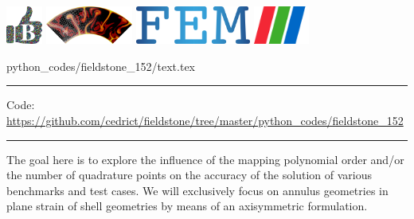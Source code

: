 \noindent
\includegraphics[height=1.25cm]{images/pictograms/benchmark}
\includegraphics[height=1.25cm]{images/pictograms/aspect_logo}
\includegraphics[height=1.25cm]{images/pictograms/FEM}
\includegraphics[height=1.25cm]{images/pictograms/paraview}



\begin{flushright} {\tiny {\color{gray} python\_codes/fieldstone\_152/text.tex}} \end{flushright}



\par\noindent\rule{\textwidth}{0.4pt}

\begin{center}
\inpython
{\small Code: \url{https://github.com/cedrict/fieldstone/tree/master/python_codes/fieldstone_152}}
\end{center}

\par\noindent\rule{\textwidth}{0.4pt}




The goal here is to explore the influence of the mapping polynomial order and/or
the number of quadrature points on the accuracy of the solution of various benchmarks and test cases.
We will exclusively focus on annulus geometries in plane strain of 
shell geometries by means of an axisymmetric formulation.


